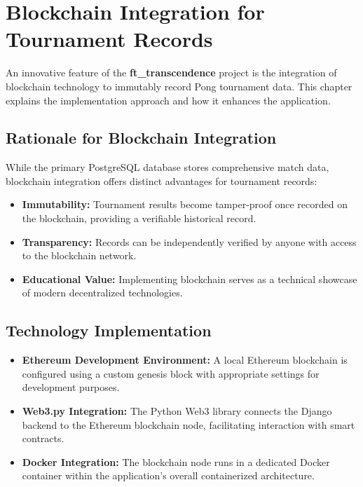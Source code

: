 \chapter{Blockchain Integration for Tournament Records}
\label{ch:blockchain}

An innovative feature of the \textbf{ft\_transcendence} project is the integration of blockchain technology to immutably record Pong tournament data. This chapter explains the implementation approach and how it enhances the application.

\section{Rationale for Blockchain Integration}
\label{sec:blockchain_rationale}
While the primary PostgreSQL database stores comprehensive match data, blockchain integration offers distinct advantages for tournament records:
\begin{itemize}
    \item \textbf{Immutability:} Tournament results become tamper-proof once recorded on the blockchain, providing a verifiable historical record.
    \item \textbf{Transparency:} Records can be independently verified by anyone with access to the blockchain network.
    \item \textbf{Educational Value:} Implementing blockchain serves as a technical showcase of modern decentralized technologies.
\end{itemize}

\section{Technology Implementation}
\label{sec:blockchain_tech}
\begin{itemize}
    \item \textbf{Ethereum Development Environment:} A local Ethereum blockchain is configured using a custom genesis block with appropriate settings for development purposes.
    \item \textbf{Web3.py Integration:} The Python Web3 library connects the Django backend to the Ethereum blockchain node, facilitating interaction with smart contracts.
    \item \textbf{Docker Integration:} The blockchain node runs in a dedicated Docker container within the application's overall containerized architecture.
\end{itemize}

